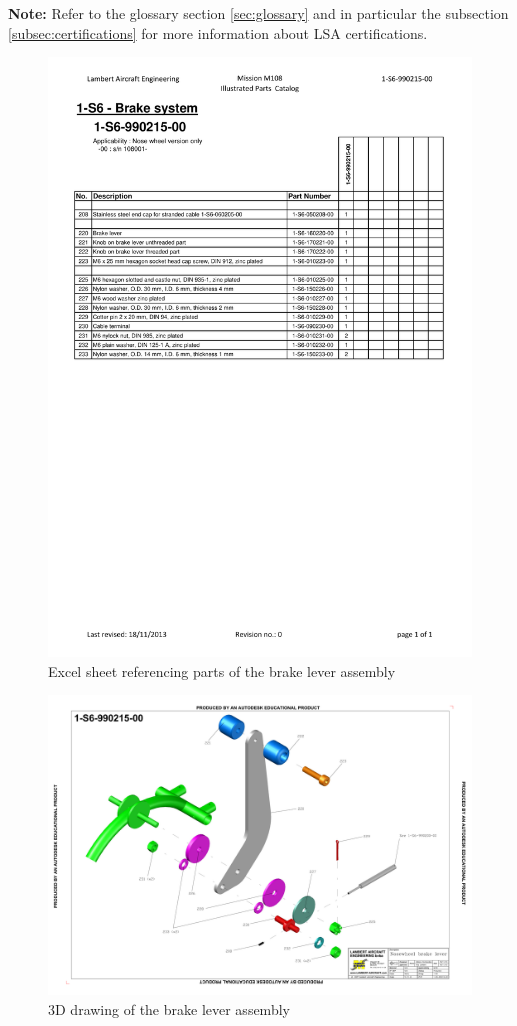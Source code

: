 \documentclass[11pt,a4paper]{article}
\begin{document}
\textbf{Note:} Refer to the glossary section \ref{sec:glossary} and in particular the subsection \ref{subsec:certifications} for more information about LSA certifications.

\begin{figure}[ht!]
	\begin{center}
		\includegraphics[width=11.5cm,trim = 1cm 14.5cm 1cm 0.5cm, clip]{pics/PIC011.pdf}
		\caption{Excel sheet referencing parts of the brake lever assembly}
		\label{fig:PIC11}
	\end{center}
\end{figure}

\begin{figure}[ht!]
	\begin{center}
		\includegraphics[width=11.5cm,trim = 1.5cm 1.5cm 1.5cm 1.5cm, clip]{pics/PIC012.pdf}
		\caption{3D drawing of the brake lever assembly}
		\label{fig:PIC012}
	\end{center}
\end{figure}
\end{document}
